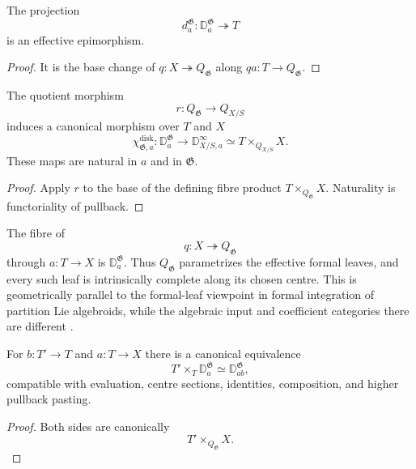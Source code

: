 \begin{proposition}
\label{prop:formal-disk-effective}
The projection
\[
    d^{\mathfrak G}_a:
    \mathbb D^{\mathfrak G}_a\twoheadrightarrow T
\]
is an effective epimorphism.
\end{proposition}

\begin{proof}
It is the base change of
$q:X\twoheadrightarrow Q_{\mathfrak G}$
along $qa:T\to Q_{\mathfrak G}$.
\end{proof}

\begin{proposition}
\label{prop:formal-disk-ambient-comparison}
The quotient morphism
\[
    r:Q_{\mathfrak G}\to Q_{X/S}
\]
induces a canonical morphism over $T$ and $X$
\[
    \chi^{\mathrm{disk}}_{\mathfrak G,a}:
    \mathbb D^{\mathfrak G}_a
    \longrightarrow
    \mathbb D^\infty_{X/S,a}
    \simeq
    T\times_{Q_{X/S}}X.
\]
These maps are natural in $a$ and in $\mathfrak G$.
\end{proposition}

\begin{proof}
Apply $r$ to the base of the defining fibre product
$T\times_{Q_{\mathfrak G}}X$.  Naturality is functoriality of pullback.
\end{proof}

\begin{remark}
The fibre of
\[
    q:X\twoheadrightarrow Q_{\mathfrak G}
\]
through $a:T\to X$ is $\mathbb D^{\mathfrak G}_a$.  Thus
$Q_{\mathfrak G}$ parametrizes the effective formal leaves, and every such
leaf is intrinsically complete along its chosen centre.  This is geometrically
parallel to the formal-leaf viewpoint in formal integration of partition Lie
algebroids, while the algebraic input and coefficient categories there are
different \cite{BrantnerMagidsonNuiten2025}.
\end{remark}

\begin{proposition}
\label{prop:formal-disk-cartesian}
For $b:T'\to T$ and $a:T\to X$ there is a canonical equivalence
\[
    T'\times_T\mathbb D^{\mathfrak G}_a
    \simeq
    \mathbb D^{\mathfrak G}_{ab},
\]
compatible with evaluation, centre sections, identities, composition, and
higher pullback pasting.
\end{proposition}

\begin{proof}
Both sides are canonically
\[
    T'\times_{Q_{\mathfrak G}}X.
\]
\end{proof}


